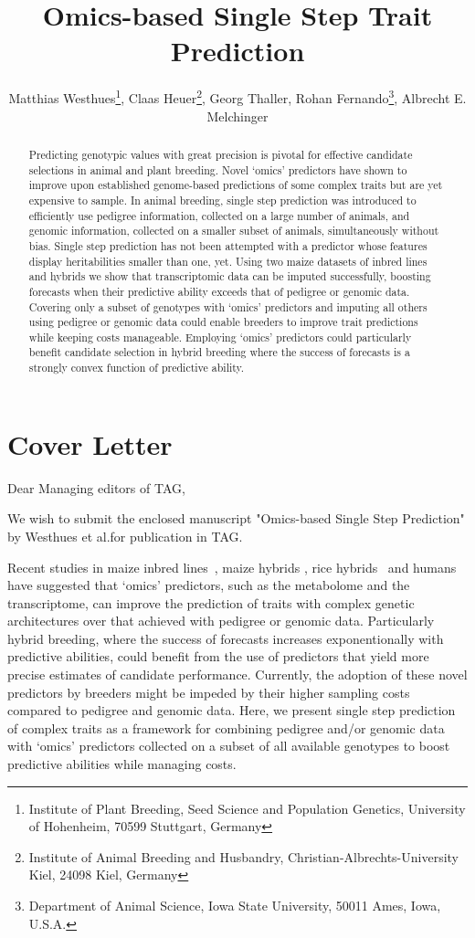 \documentclass[12pt,titlepage]{article}
\title{Omics-based Single Step Trait Prediction}
\author{
  Matthias Westhues\thanks{Institute of Plant Breeding, Seed Science and Population Genetics, University of Hohenheim, 70599 Stuttgart, Germany},
  Claas Heuer\thanks{Institute of Animal Breeding and Husbandry, Christian-Albrechts-University Kiel, 24098 Kiel, Germany},
  Georg Thaller\samethanks[2],
  Rohan Fernando\thanks{Department of Animal Science, Iowa State University, 50011 Ames, Iowa, U.S.A.},
  Albrecht E. Melchinger\samethanks[1]
}
\begin{document}
\maketitle
\doublespacing
\linenumbers



\begin{abstract}
Predicting genotypic values with great precision is pivotal for effective
candidate selections in animal and plant breeding.
Novel `omics' predictors have shown to improve upon established genome-based
predictions of some complex traits but are yet expensive to sample.
In animal breeding, single step prediction was introduced to efficiently use
pedigree information, collected on a large number of animals, and genomic
information, collected on a smaller subset of animals, simultaneously without
bias.
Single step prediction has not been attempted with a predictor whose features
display heritabilities smaller than one, yet.
Using two maize datasets of inbred lines and hybrids we show that transcriptomic
data can be imputed successfully, boosting forecasts when their predictive
ability exceeds that of pedigree or genomic data.
Covering only a subset of genotypes with `omics' predictors and imputing all
others using pedigree or genomic data could enable breeders to improve trait
predictions while keeping costs manageable.
Employing `omics' predictors could particularly benefit candidate selection in
hybrid breeding where the success of forecasts is a strongly convex function of
predictive ability.
\end{abstract}


\section{Cover Letter}
Dear Managing editors of TAG,

We wish to submit the enclosed manuscript "Omics-based Single Step Prediction"
by Westhues et al.\@ for publication in TAG.

Recent studies in maize inbred lines~\cite{Guo2016}, maize hybrids
\cite{Zenke-Philippi2017,Westhues2017}, rice hybrids~\cite{Dan2016,Xu2016} and
humans~\cite{Vazquez2016} have suggested that `omics' predictors, such as the
metabolome and the transcriptome, can improve the prediction of traits with
complex genetic architectures over that achieved with pedigree or genomic data.
Particularly hybrid breeding, where the success of forecasts increases
exponentionally with predictive abilities, could benefit from the use of
predictors that yield more precise estimates of candidate performance.
Currently, the adoption of these novel predictors by breeders might be impeded
by their higher sampling costs compared to pedigree and genomic data.
Here, we present single step prediction of complex traits as a framework for
combining pedigree and/or genomic data with `omics' predictors collected on a
subset of all available genotypes to boost predictive abilities while managing
costs.
\end{document}
